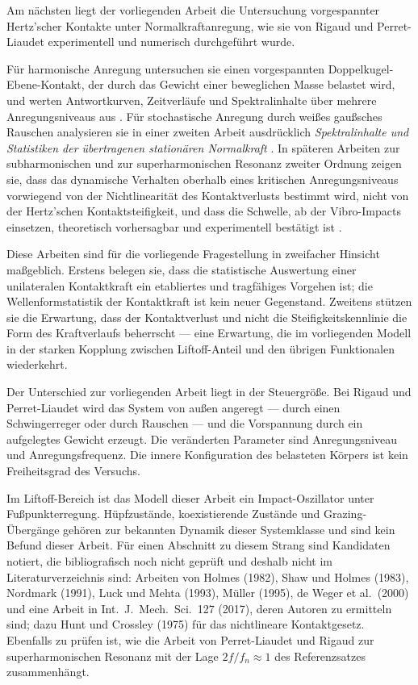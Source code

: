 \documentclass[12pt,a4paper]{report}
\begin{document}
Am nächsten liegt der vorliegenden Arbeit die Untersuchung
vorgespannter Hertz'scher Kontakte unter Normalkraftanregung, wie sie
von Rigaud und Perret-Liaudet experimentell und numerisch durchgeführt
wurde.

Für harmonische Anregung untersuchen sie einen vorgespannten
Doppelkugel-Ebene-Kontakt, der durch das Gewicht einer beweglichen Masse
belastet wird, und werten Antwortkurven, Zeitverläufe und
Spektralinhalte über mehrere Anregungsniveaus aus \cite{rigaud2003}. Für
stochastische Anregung durch weißes gaußsches Rauschen analysieren sie
in einer zweiten Arbeit ausdrücklich \emph{Spektralinhalte und
Statistiken der übertragenen stationären Normalkraft}
\cite{perretliaudet2003}. In späteren Arbeiten zur subharmonischen und zur superharmonischen
Resonanz zweiter Ordnung zeigen sie, dass das dynamische Verhalten
oberhalb eines kritischen Anregungsniveaus vorwiegend von der
Nichtlinearität des Kontaktverlusts bestimmt wird, nicht von der
Hertz'schen Kontaktsteifigkeit, und dass die Schwelle, ab der
Vibro-Impacts einsetzen, theoretisch vorhersagbar und experimentell
bestätigt ist \cite{perretliaudet2006, perretliaudet2007}.

Diese Arbeiten sind für die vorliegende Fragestellung in zweifacher
Hinsicht maßgeblich. Erstens belegen sie, dass die statistische
Auswertung einer unilateralen Kontaktkraft ein etabliertes und
tragfähiges Vorgehen ist; die Wellenformstatistik der Kontaktkraft ist
kein neuer Gegenstand. Zweitens stützen sie die Erwartung, dass der
Kontaktverlust und nicht die Steifigkeitskennlinie die Form des
Kraftverlaufs beherrscht --- eine Erwartung, die im vorliegenden Modell
in der starken Kopplung zwischen Liftoff-Anteil und den übrigen
Funktionalen wiederkehrt.

Der Unterschied zur vorliegenden Arbeit liegt in der Steuergröße. Bei
Rigaud und Perret-Liaudet wird das System von außen angeregt --- durch
einen Schwingerreger oder durch Rauschen --- und die Vorspannung durch
ein aufgelegtes Gewicht erzeugt. Die veränderten Parameter sind
Anregungsniveau und Anregungsfrequenz. Die innere Konfiguration des
belasteten Körpers ist kein Freiheitsgrad des Versuchs.

Im Liftoff-Bereich ist das Modell dieser Arbeit ein Impact-Oszillator
unter Fußpunkterregung. Hüpfzustände, koexistierende Zustände und
Grazing-Übergänge gehören zur bekannten Dynamik dieser Systemklasse und
sind kein Befund dieser Arbeit. Für einen Abschnitt zu diesem Strang sind
Kandidaten notiert, die bibliografisch noch nicht geprüft und deshalb
nicht im Literaturverzeichnis sind: Arbeiten von Holmes (1982), Shaw und
Holmes (1983), Nordmark (1991), Luck und Mehta (1993), Müller (1995),
de Weger et al.\ (2000) und eine Arbeit in Int.\ J.\ Mech.\ Sci.\ 127
(2017), deren Autoren zu ermitteln sind; dazu Hunt und Crossley (1975)
für das nichtlineare Kontaktgesetz. Ebenfalls zu prüfen ist, wie die
Arbeit von Perret-Liaudet und Rigaud zur superharmonischen Resonanz
\cite{perretliaudet2007} mit der Lage $2f/f_n \approx 1$ des
Referenzsatzes zusammenhängt.
\end{document}
